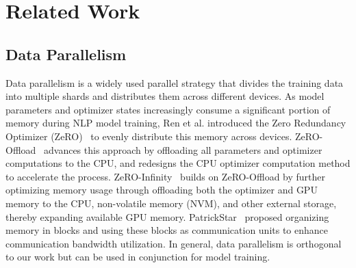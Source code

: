 \section{Related Work}
\label{sec:related}
\subsection{Data Parallelism}
Data parallelism is a widely used parallel strategy
that divides the training data into multiple shards
and distributes them across different devices.
As model parameters and optimizer states increasingly consume
a significant portion of memory during NLP model training,
Ren et al. introduced the Zero Redundancy Optimizer (ZeRO)~\cite{rajbhandariZeROMemoryOptimizations2020}
to evenly distribute this memory across devices.
ZeRO-Offload~\cite{renZerooffloadDemocratizingBillionScale2021} advances this approach
by offloading all parameters and optimizer computations to the CPU,
and redesigns the CPU optimizer computation method to accelerate the process.
ZeRO-Infinity~\cite{rajbhandariZeROinfinityBreakingGPU2021} builds on ZeRO-Offload
by further optimizing memory usage through offloading both the optimizer and GPU memory to the CPU,
non-volatile memory (NVM), and other external storage, thereby expanding available GPU memory.
PatrickStar~\cite{fangParallelTrainingPreTrained2022} proposed organizing memory in blocks
and using these blocks as communication units to enhance communication bandwidth utilization.
In general, data parallelism is orthogonal to our work but can be used in conjunction for model training.

